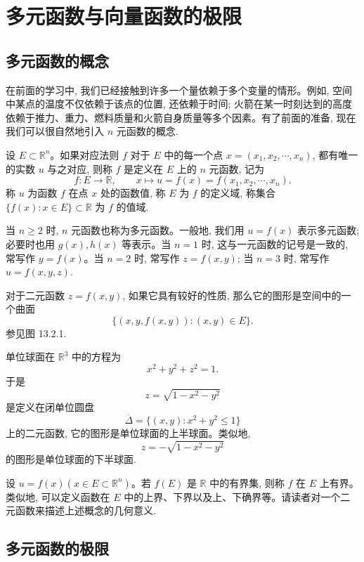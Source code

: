 \section{多元函数与向量函数的极限}
\label{sec:ma-13-2}

\subsection{多元函数的概念}
\label{subsec:ma-13-2-1}

在前面的学习中, 我们已经接触到许多一个量依赖于多个变量的情形。例如, 空间中某点的温度不仅依赖于该点的位置, 还依赖于时间; 火箭在某一时刻达到的高度依赖于推力、重力、燃料质量和火箭自身质量等多个因素。有了前面的准备, 现在我们可以很自然地引入 $n$ 元函数的概念.

\begin{definition}\label{definition:ma-13-2-1}
设 $E\subset\mathbb R^n$。如果对应法则 $f$ 对于 $E$ 中的每一个点 $x=(x_1,x_2,\cdots,x_n)$, 都有唯一的实数 $u$ 与之对应, 则称 $f$ 是定义在 $E$ 上的 $n$ 元函数, 记为
\[
  f:E\to\mathbb R,\qquad x\mapsto u=f(x)=f(x_1,x_2,\cdots,x_n).
\]
称 $u$ 为函数 $f$ 在点 $x$ 处的函数值, 称 $E$ 为 $f$ 的定义域, 称集合 $\{f(x):x\in E\}\subset\mathbb R$ 为 $f$ 的值域.
\end{definition}

当 $n\geqslant2$ 时, $n$ 元函数也称为多元函数。一般地, 我们用 $u=f(x)$ 表示多元函数; 必要时也用 $g(x),h(x)$ 等表示。当 $n=1$ 时, 这与一元函数的记号是一致的, 常写作 $y=f(x)$。当 $n=2$ 时, 常写作 $z=f(x,y)$; 当 $n=3$ 时, 常写作 $u=f(x,y,z)$.

对于二元函数 $z=f(x,y)$, 如果它具有较好的性质, 那么它的图形是空间中的一个曲面
\[
  \{(x,y,f(x,y)):(x,y)\in E\}.
\]
参见图 13.2.1.

\begin{example}\label{example:ma-13-2-1}
单位球面在 $\mathbb R^3$ 中的方程为
\[
  x^2+y^2+z^2=1.
\]
于是
\[
  z=\sqrt{1-x^2-y^2}
\]
是定义在闭单位圆盘
\[
  \overline\Delta=\{(x,y):x^2+y^2\leqslant1\}
\]
上的二元函数, 它的图形是单位球面的上半球面。类似地,
\[
  z=-\sqrt{1-x^2-y^2}
\]
的图形是单位球面的下半球面.
\end{example}

设 $u=f(x)(x\in E\subset\mathbb R^n)$。若 $f(E)$ 是 $\mathbb R$ 中的有界集, 则称 $f$ 在 $E$ 上有界。类似地, 可以定义函数在 $E$ 中的上界、下界以及上、下确界等。请读者对一个二元函数来描述上述概念的几何意义.

\subsection{多元函数的极限}
\label{subsec:ma-13-2-2}

